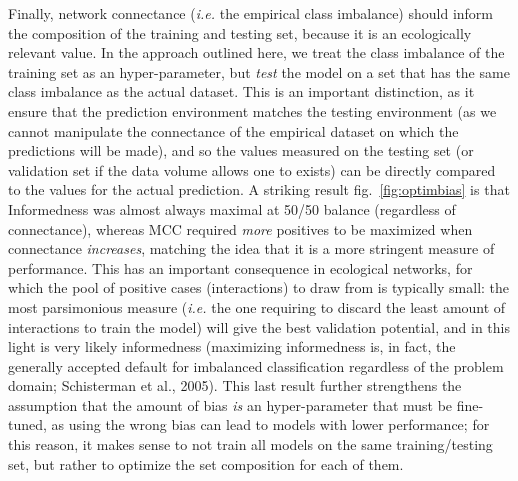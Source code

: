 \documentclass[11pt]{article}
\begin{document}
Finally, network connectance (\emph{i.e.} the empirical class imbalance)
should inform the composition of the training and testing set, because
it is an ecologically relevant value. In the approach outlined here, we
treat the class imbalance of the training set as an hyper-parameter, but
\emph{test} the model on a set that has the same class imbalance as the
actual dataset. This is an important distinction, as it ensure that the
prediction environment matches the testing environment (as we cannot
manipulate the connectance of the empirical dataset on which the
predictions will be made), and so the values measured on the testing set
(or validation set if the data volume allows one to exists) can be
directly compared to the values for the actual prediction. A striking
result fig.~\ref{fig:optimbias} is that Informedness was almost always
maximal at 50/50 balance (regardless of connectance), whereas MCC
required \emph{more} positives to be maximized when connectance
\emph{increases}, matching the idea that it is a more stringent measure
of performance. This has an important consequence in ecological
networks, for which the pool of positive cases (interactions) to draw
from is typically small: the most parsimonious measure (\emph{i.e.} the
one requiring to discard the least amount of interactions to train the
model) will give the best validation potential, and in this light is
very likely informedness (maximizing informedness is, in fact, the
generally accepted default for imbalanced classification regardless of
the problem domain; Schisterman et al., 2005). This last result further
strengthens the assumption that the amount of bias \emph{is} an
hyper-parameter that must be fine-tuned, as using the wrong bias can
lead to models with lower performance; for this reason, it makes sense
to not train all models on the same training/testing set, but rather to
optimize the set composition for each of them.
\end{document}
